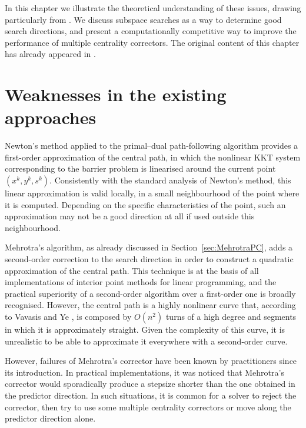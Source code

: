 
%
%
\label{ch:Correctors}

In this chapter we illustrate the theoretical understanding of 
these issues, drawing particularly from \cite{Cartis04,Cartis05}.
We discuss subspace searches as a way to determine good
search directions, and present a computationally competitive way
to improve the performance of multiple centrality correctors.
The original content of this chapter has already appeared 
in \cite{ColomboGondzio05}.


%
%
\section{Weaknesses in the existing approaches}

Newton's method applied to the primal--dual path-following algorithm 
provides a first-order approximation of the central path, in which
the nonlinear KKT system corresponding to the barrier problem 
is linearised around the current point $(x^k,y^k,s^k)$. Consistently with 
the standard analysis of Newton's method, this linear approximation 
is valid locally, in a small neighbourhood of the point where 
it is computed. Depending on the specific characteristics of the point, 
such an approximation may not be a good direction at all 
if used outside this neighbourhood.

Mehrotra's algorithm, as already discussed in 
Section~\ref{sec:MehrotraPC}, adds a second-order correction to the search 
direction in order to construct a quadratic approximation 
of the central path. This technique is at the basis of all
implementations of interior point methods for linear programming,
and the practical superiority of a second-order algorithm over 
a first-order one is broadly recognised.
However, the central path is a highly nonlinear curve that, according 
to Vavasis and Ye \cite{VavasisYe}, is composed by $O(n^2)$ turns 
of a high degree and segments in which it is approximately straight. 
Given the complexity of this curve, it is unrealistic to be able 
to approximate it everywhere with a second-order curve.


However, failures of Mehrotra's corrector have been known by practitioners 
since its introduction. In practical implementations, it was noticed 
that Mehrotra's corrector would sporadically produce a stepsize 
shorter than the one obtained in the predictor direction. 
In such situations, it is common for a solver
to reject the corrector, then try to use some multiple centrality 
correctors or move along the predictor direction alone.

